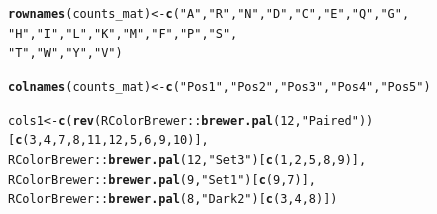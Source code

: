 \documentclass[12pt]{article}\usepackage[]{graphicx}\usepackage[usenames,dvipsnames]{color}
\makeatletter
\newcommand{\hlnum}[1]{\textcolor[rgb]{0.686,0.059,0.569}{#1}}%
\newcommand{\hlstr}[1]{\textcolor[rgb]{0.192,0.494,0.8}{#1}}%
\newcommand{\hlopt}[1]{\textcolor[rgb]{0,0,0}{#1}}%
\newcommand{\hlstd}[1]{\textcolor[rgb]{0.345,0.345,0.345}{#1}}%
\newcommand{\hlkwb}[1]{\textcolor[rgb]{0.69,0.353,0.396}{#1}}%
\newcommand{\hlkwd}[1]{\textcolor[rgb]{0.737,0.353,0.396}{\textbf{#1}}}%
\newenvironment{kframe}{%
 \def\at@end@of@kframe{}%
 \ifinner\ifhmode%
  \def\at@end@of@kframe{\end{minipage}}%
  \begin{minipage}{\columnwidth}%
 \fi\fi%
 \def\FrameCommand##1{\hskip\@totalleftmargin \hskip-\fboxsep
 \colorbox{shadecolor}{##1}\hskip-\fboxsep
     \hskip-\linewidth \hskip-\@totalleftmargin \hskip\columnwidth}%
 \MakeFramed {\advance\hsize-\width
   \@totalleftmargin\z@ \linewidth\hsize
   \@setminipage}}%
 {\par\unskip\endMakeFramed%
 \at@end@of@kframe}
\newenvironment{knitrout}{}{} %
\makeatother
\begin{document}
\begin{figure}[htp]
\begin{center}
\begin{knitrout}
\color{fgcolor}\begin{kframe}
\begin{alltt}
\hlkwd{rownames}\hlstd{(counts_mat)} \hlkwb{<-} \hlkwd{c}\hlstd{(}\hlstr{"A"}\hlstd{,} \hlstr{"R"}\hlstd{,} \hlstr{"N"}\hlstd{,} \hlstr{"D"}\hlstd{,}\hlstr{"C"}\hlstd{,} \hlstr{"E"}\hlstd{,} \hlstr{"Q"}\hlstd{,} \hlstr{"G"}\hlstd{,}
                          \hlstr{"H"}\hlstd{,} \hlstr{"I"}\hlstd{,} \hlstr{"L"}\hlstd{,} \hlstr{"K"}\hlstd{,} \hlstr{"M"}\hlstd{,} \hlstr{"F"}\hlstd{,} \hlstr{"P"}\hlstd{,} \hlstr{"S"}\hlstd{,}
                          \hlstr{"T"}\hlstd{,} \hlstr{"W"}\hlstd{,} \hlstr{"Y"}\hlstd{,} \hlstr{"V"}\hlstd{)}

\hlkwd{colnames}\hlstd{(counts_mat)} \hlkwb{<-} \hlkwd{c}\hlstd{(}\hlstr{"Pos 1"}\hlstd{,} \hlstr{"Pos 2"}\hlstd{,} \hlstr{"Pos 3"}\hlstd{,} \hlstr{"Pos 4"}\hlstd{,} \hlstr{"Pos 5"}\hlstd{)}

\hlstd{cols1} \hlkwb{<-} \hlkwd{c}\hlstd{(}\hlkwd{rev}\hlstd{(RColorBrewer}\hlopt{::}\hlkwd{brewer.pal}\hlstd{(}\hlnum{12}\hlstd{,} \hlstr{"Paired"}\hlstd{))[}\hlkwd{c}\hlstd{(}\hlnum{3}\hlstd{,}\hlnum{4}\hlstd{,}\hlnum{7}\hlstd{,}\hlnum{8}\hlstd{,}\hlnum{11}\hlstd{,}\hlnum{12}\hlstd{,}\hlnum{5}\hlstd{,}\hlnum{6}\hlstd{,}\hlnum{9}\hlstd{,}\hlnum{10}\hlstd{)],}
           \hlstd{RColorBrewer}\hlopt{::}\hlkwd{brewer.pal}\hlstd{(}\hlnum{12}\hlstd{,} \hlstr{"Set3"}\hlstd{)[}\hlkwd{c}\hlstd{(}\hlnum{1}\hlstd{,}\hlnum{2}\hlstd{,}\hlnum{5}\hlstd{,}\hlnum{8}\hlstd{,}\hlnum{9}\hlstd{)],}
           \hlstd{RColorBrewer}\hlopt{::}\hlkwd{brewer.pal}\hlstd{(}\hlnum{9}\hlstd{,} \hlstr{"Set1"}\hlstd{)[}\hlkwd{c}\hlstd{(}\hlnum{9}\hlstd{,}\hlnum{7}\hlstd{)],}
           \hlstd{RColorBrewer}\hlopt{::}\hlkwd{brewer.pal}\hlstd{(}\hlnum{8}\hlstd{,} \hlstr{"Dark2"}\hlstd{)[}\hlkwd{c}\hlstd{(}\hlnum{3}\hlstd{,}\hlnum{4}\hlstd{,}\hlnum{8}\hlstd{)])}


\end{alltt}
\end{kframe}
\end{knitrout}
\end{center}
\end{figure}
\end{document}

